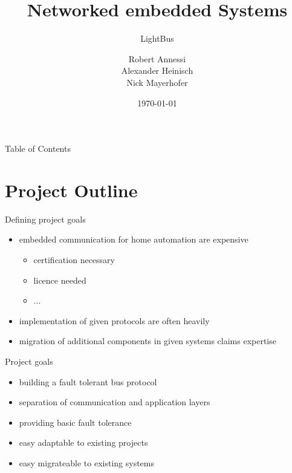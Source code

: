 \documentclass{beamer}
\title {Networked embedded Systems}
\subtitle {LightBus}
\author{Robert Annessi\\ Alexander Heinisch\\ Nick Mayerhofer}
\date{\customdate\today}
\begin{document}
\begin{frame}
  \titlepage
\end{frame}
 \logo{}

\begin{frame}{Table of Contents}
  \tableofcontents
\end{frame}


\section{Project Outline}
\begin{frame}{Defining project goals}%
\begin{center}
\begin{itemize}
  \item embedded communication for home automation are expensive
    \begin{itemize}
      \item certification necessary
      \item licence needed
      \item ...
    \end{itemize}
  \item implementation of given protocols are often heavily
  \item migration of additional components in given systems claims expertise
\end{itemize}
\end{center}
\end{frame}

\begin{frame}{Project goals}%
\begin{center}
\begin{itemize}
 \item \begin{large}building a fault tolerant bus protocol\end{large}
 \item \begin{large}separation of communication and application layers\end{large}
 \item \begin{large}providing basic fault tolerance\end{large}
 \item \begin{large}easy adaptable to existing projects\end{large}
 \item \begin{large}easy migrateable to existing systems\end{large}
\end{itemize}
\end{center}
\end{frame}
\end{document}
